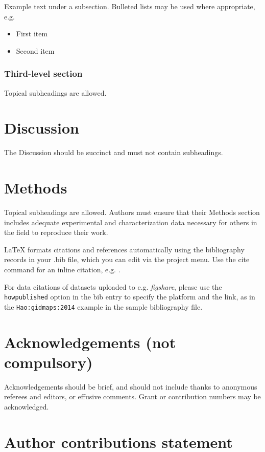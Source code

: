 \documentclass[fleqn,10pt]{wlscirep}
\begin{document}
Example text under a subsection. Bulleted lists may be used where appropriate, e.g.

\begin{itemize}
\item First item
\item Second item
\end{itemize}

\subsubsection*{Third-level section}
 
Topical subheadings are allowed.

\section*{Discussion}

The Discussion should be succinct and must not contain subheadings.

\section*{Methods}

Topical subheadings are allowed. Authors must ensure that their Methods section includes adequate experimental and characterization data necessary for others in the field to reproduce their work.



\noindent LaTeX formats citations and references automatically using the bibliography records in your .bib file, which you can edit via the project menu. Use the cite command for an inline citation, e.g.  \cite{Hao:gidmaps:2014}.

For data citations of datasets uploaded to e.g. \emph{figshare}, please use the \verb|howpublished| option in the bib entry to specify the platform and the link, as in the \verb|Hao:gidmaps:2014| example in the sample bibliography file.

\section*{Acknowledgements (not compulsory)}

Acknowledgements should be brief, and should not include thanks to anonymous referees and editors, or effusive comments. Grant or contribution numbers may be acknowledged.

\section*{Author contributions statement}
\end{document}
